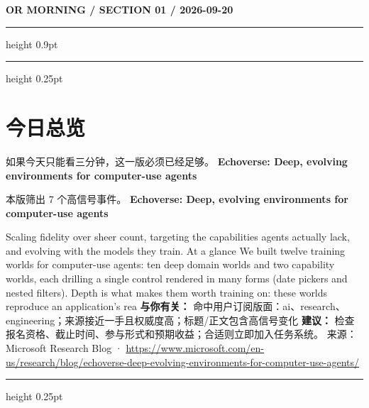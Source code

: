 \documentclass[10.5pt]{ctexart}
\begin{document}
{\small\bfseries OR MORNING / SECTION 01 / 2026-09-20}
\vspace{2mm}
\hrule height 0.9pt
\vspace{1.5mm}
\hrule height 0.25pt
\vspace{4mm}
\section*{今日总览}
{\color{ormuted} 如果今天只能看三分钟，这一版必须已经足够。}
\vspace{2mm}
{\fontsize{25}{29}\selectfont\bfseries Echoverse: Deep, evolving environments for computer-use agents}\par
\vspace{2mm}
{\large 本版筛出 7 个高信号事件。}
\vspace{3mm}
{\Large\bfseries Echoverse: Deep, evolving environments for computer-use agents}\par
Scaling fidelity over sheer count, targeting the capabilities agents actually lack, and evolving with the models they train. At a glance We built twelve training worlds for computer-use agents: ten deep domain worlds and two capability worlds, each drilling a single control rendered in many forms (date pickers and nested filters). Depth is what makes them worth training on: these worlds reproduce an application’s rea
\textbf{与你有关：} 命中用户订阅版面：ai、research、engineering；来源接近一手且权威度高；标题/正文包含高信号变化
\textbf{建议：} 检查报名资格、截止时间、参与形式和预期收益；合适则立即加入任务系统。
{\footnotesize\color{ormuted} 来源：Microsoft Research Blog · \url{https://www.microsoft.com/en-us/research/blog/echoverse-deep-evolving-environments-for-computer-use-agents/}}
\vspace{3mm}
\hrule height 0.25pt
\vspace{3mm}
\end{document}
